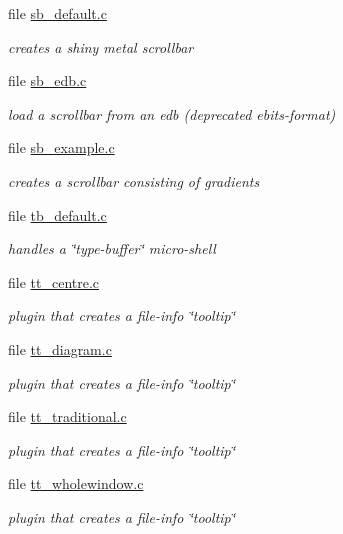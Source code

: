 \begin{CompactItemize}
\item 
file \hyperlink{sb__default_8c}{sb\_\-default.c}
\begin{CompactList}\small\item\em creates a shiny metal scrollbar \item\end{CompactList}

\item 
file \hyperlink{sb__edb_8c}{sb\_\-edb.c}
\begin{CompactList}\small\item\em load a scrollbar from an edb (deprecated ebits-format) \item\end{CompactList}

\item 
file \hyperlink{sb__example_8c}{sb\_\-example.c}
\begin{CompactList}\small\item\em creates a scrollbar consisting of gradients \item\end{CompactList}

\item 
file \hyperlink{tb__default_8c}{tb\_\-default.c}
\begin{CompactList}\small\item\em handles a \char`\"{}type-buffer\char`\"{} micro-shell \item\end{CompactList}

\item 
file \hyperlink{tt__centre_8c}{tt\_\-centre.c}
\begin{CompactList}\small\item\em plugin that creates a file-info \char`\"{}tooltip\char`\"{} \item\end{CompactList}

\item 
file \hyperlink{tt__diagram_8c}{tt\_\-diagram.c}
\begin{CompactList}\small\item\em plugin that creates a file-info \char`\"{}tooltip\char`\"{} \item\end{CompactList}

\item 
file \hyperlink{tt__traditional_8c}{tt\_\-traditional.c}
\begin{CompactList}\small\item\em plugin that creates a file-info \char`\"{}tooltip\char`\"{} \item\end{CompactList}

\item 
file \hyperlink{tt__wholewindow_8c}{tt\_\-wholewindow.c}
\begin{CompactList}\small\item\em plugin that creates a file-info \char`\"{}tooltip\char`\"{} \item\end{CompactList}

\end{CompactItemize}
